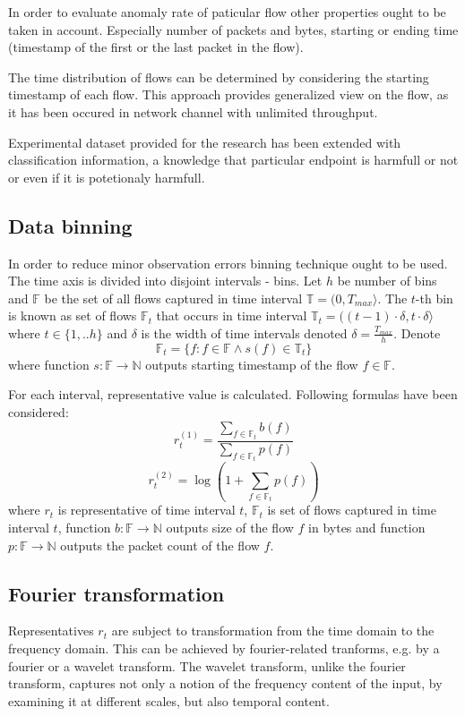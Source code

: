\documentclass[a4paper]{IEEEtran}
\begin{document}
In order to evaluate anomaly rate of paticular flow other properties ought to be
taken in account. Especially number of packets and bytes, starting or ending time
(timestamp of the first or the last packet in the flow).

The time distribution of flows can be determined by considering the
starting timestamp of each flow. This approach provides generalized view on the flow, 
as it has been occured in network channel with unlimited throughput.

Experimental dataset provided for the research has been extended with
classification information, a knowledge that particular endpoint is 
harmfull or not or even if it is potetionaly harmfull.

\subsection{Data binning}
In order to reduce minor observation errors binning technique ought to be used.
The time axis is divided into disjoint intervals - bins.
Let $h$ be number of bins and $\mathbb{F}$ be the set of all flows captured in time interval
$\mathbb{T} = (0, T_{max}\rangle $. The $t$-th bin is known as 
set of flows $\mathbb{F}_t$ 
that occurs in time interval
$\mathbb{T}_t = ((t-1)\cdot \delta, t\cdot \delta\rangle $ where 
$t \in \{1, .. h\}$ and $\delta$ is the width of time intervals
denoted $\delta = \frac{T_{max}}{h}$.
Denote
\[
\mathbb{F}_t = \{f : f \in \mathbb{F} \wedge s(f) \in \mathbb{T}_t \}
\]
where function $s:\mathbb{F} \rightarrow \mathbb{N} $ 
outputs starting timestamp of the flow $f\in \mathbb{F}$.

For each interval,
representative value is calculated. Following formulas have been considered:
\[
r_t^{(1)} = \frac{\sum\limits_{f\in \mathbb{F}_t}b(f)}{\sum\limits_{f\in \mathbb{F}_t}p(f)}
\]
\[
r_t^{(2)} = \log(1+\sum\limits_{f\in \mathbb{F}_t}p(f))
\]
where $r_t$ is representative of time interval $t$, $\mathbb{F}_t$ is set of flows captured in time 
interval $t$, function $b:\mathbb{F} \rightarrow \mathbb{N}$ outputs size of the flow $f$ in bytes and function 
$p:\mathbb{F} \rightarrow \mathbb{N}$ outputs the packet count of the flow $f$.


\subsection{Fourier transformation}
Representatives $r_t$ are subject to transformation from the time domain to the
frequency domain.
This can be achieved by fourier-related
tranforms, e.g. by a fourier or a wavelet transform.
The wavelet transform, unlike the fourier transform, captures
not only a notion of the frequency content of the input, by
examining it at different scales, but also temporal content.
\end{document}
